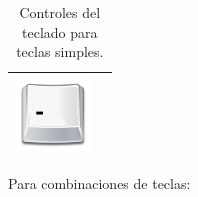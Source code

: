 \begin{table}[H]
\begin{center}
\begin{tabular}{|p{2cm}|p{10cm}|}
      \hline
      \includegraphics[width=2cm]{./imagenes/tecla_menos.png} & \vspace*{-.8in}{Disminución de velocidad. Se disminuye en una unidad la velocidad del vehículo.} \\
      \hline
    \end{tabular}
  \end{center}
\caption{Controles del teclado para teclas simples.}
\end{table}

\clearpage

Para combinaciones de teclas:\\


